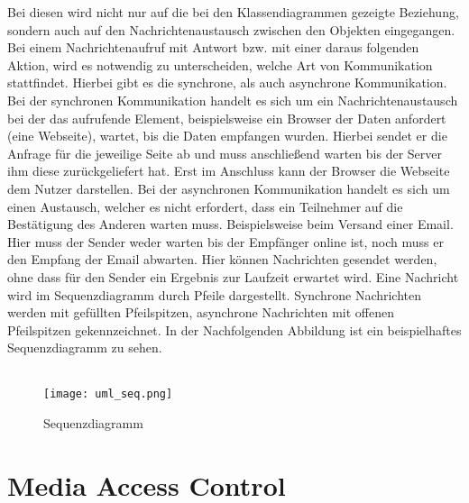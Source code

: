 Bei diesen wird nicht nur auf die bei den Klassendiagrammen gezeigte Beziehung, sondern auch auf den Nachrichtenaustausch zwischen den Objekten eingegangen.
Bei einem Nachrichtenaufruf mit Antwort bzw. mit einer daraus folgenden Aktion, wird es notwendig zu unterscheiden, welche Art von Kommunikation stattfindet. Hierbei gibt es die synchrone, als auch asynchrone Kommunikation.
Bei der synchronen Kommunikation handelt es sich um ein Nachrichtenaustausch bei der das aufrufende Element, beispielsweise ein Browser der Daten anfordert (eine Webseite), wartet, bis die Daten empfangen wurden. Hierbei sendet er die Anfrage für die jeweilige Seite ab und muss anschließend warten bis der Server ihm diese zurückgeliefert hat. Erst im Anschluss kann der Browser die Webseite dem Nutzer darstellen.
Bei der asynchronen Kommunikation handelt es sich um einen Austausch, welcher es nicht erfordert, dass ein Teilnehmer auf die Bestätigung des Anderen warten muss. Beispielsweise beim Versand einer Email. Hier muss der Sender weder warten bis der Empfänger online ist, noch muss er den Empfang der Email abwarten. Hier können Nachrichten gesendet werden, ohne dass für den Sender ein Ergebnis zur Laufzeit erwartet wird.
Eine Nachricht wird im Sequenzdiagramm durch Pfeile dargestellt. Synchrone Nachrichten werden mit gefüllten Pfeilspitzen, asynchrone Nachrichten mit offenen Pfeilspitzen gekennzeichnet. In der Nachfolgenden Abbildung ist ein beispielhaftes Sequenzdiagramm zu sehen.\\
\\
\begin{figure}[H]
\centering
\texttt{[image: uml\_seq.png]}
\caption{Sequenzdiagramm}
\label{fig:show_s1_s2_p1_n1}
\end{figure}

\section{Media Access Control}
\label{sec:mac}

